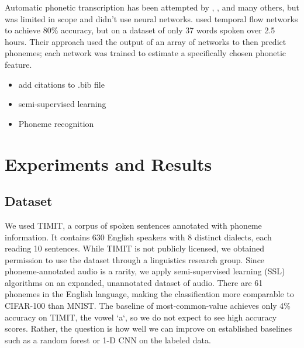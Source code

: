 \documentclass{article}
\begin{document}
Automatic phonetic transcription has been attempted by \cite{1}, \cite{2}, and many others, but was limited in scope and didn’t use neural networks. \cite{3} used temporal flow networks to achieve 80\% accuracy, but on a dataset of only 37 words spoken over 2.5 hours. Their approach used the output of an array of networks to then predict phonemes; each network was trained to estimate a specifically chosen phonetic feature.


\begin{itemize}
    \item add citations to .bib file
    \item semi-supervised learning
    \item Phoneme recognition
\end{itemize}

\section{Experiments and Results}

\subsection{Dataset}
We used TIMIT, a corpus of spoken sentences annotated with phoneme information. It contains 630 English speakers with 8 distinct dialects, each reading 10 sentences. While TIMIT is not publicly licensed, we obtained permission to use the dataset through a linguistics research group.
Since phoneme-annotated audio is a rarity, we apply semi-supervised learning (SSL) algorithms on an expanded, unannotated dataset of audio. There are 61 phonemes in the English language, making the classification more comparable to CIFAR-100 than MNIST. The baseline of most-common-value achieves only 4\% accuracy on TIMIT, the vowel `a`, so we do not expect to see high accuracy scores. Rather, the question is how well we can improve on established baselines such as a random forest or 1-D CNN on the labeled data.
\end{document}
